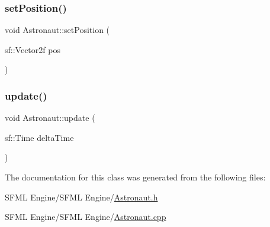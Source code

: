 \subsubsection{\texorpdfstring{set\+Position()}{setPosition()}}
{\footnotesize\ttfamily void Astronaut\+::set\+Position (\begin{DoxyParamCaption}\item[{sf\+::\+Vector2f}]{pos }\end{DoxyParamCaption})}

\hypertarget{class_astronaut_a2df268d2fa9a1783fda0c772130cddd2}{}\label{class_astronaut_a2df268d2fa9a1783fda0c772130cddd2} 
\subsubsection{\texorpdfstring{update()}{update()}}
{\footnotesize\ttfamily void Astronaut\+::update (\begin{DoxyParamCaption}\item[{sf\+::\+Time}]{delta\+Time }\end{DoxyParamCaption})}



The documentation for this class was generated from the following files\+:\begin{DoxyCompactItemize}
\item 
S\+F\+M\+L Engine/\+S\+F\+M\+L Engine/\hyperlink{_astronaut_8h}{Astronaut.\+h}\item 
S\+F\+M\+L Engine/\+S\+F\+M\+L Engine/\hyperlink{_astronaut_8cpp}{Astronaut.\+cpp}\end{DoxyCompactItemize}

